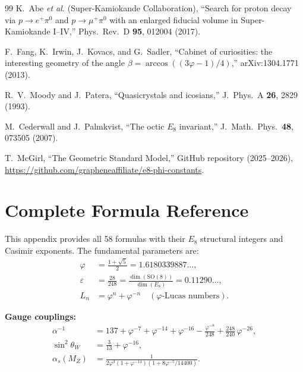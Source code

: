 \documentclass[aps,prd,twocolumn,superscriptaddress,nofootinbib,showpacs]{revtex4-2}
\begin{document}
\begin{thebibliography}{99}
K.~Abe \textit{et al.} (Super-Kamiokande Collaboration),
``Search for proton decay via $p \to e^+ \pi^0$ and $p \to \mu^+
\pi^0$ with an enlarged fiducial volume in Super-Kamiokande I--IV,''
Phys.\ Rev.\ D \textbf{95}, 012004 (2017).

F.~Fang, K.~Irwin, J.~Kovacs, and G.~Sadler,
``Cabinet of curiosities: the interesting geometry of the angle
$\beta = \arccos((3\varphi - 1)/4)$,''
arXiv:1304.1771 (2013).

R.~V.~Moody and J.~Patera,
``Quasicrystals and icosians,''
J.\ Phys.\ A \textbf{26}, 2829 (1993).

M.~Cederwall and J.~Palmkvist,
``The octic $E_8$ invariant,''
J.\ Math.\ Phys.\ \textbf{48}, 073505 (2007).

T.~McGirl,
``The Geometric Standard Model,''
GitHub repository (2025--2026),
\url{https://github.com/grapheneaffiliate/e8-phi-constants}.

\end{thebibliography}

\appendix

\section{Complete Formula Reference}\label{app:formulas}

This appendix provides all 58 formulas with their $E_8$ structural
integers and Casimir exponents.  The fundamental parameters are:
\begin{align}
\varphi &= \frac{1+\sqrt{5}}{2} = 1.6180339887\ldots, \nonumber \\
\varepsilon &= \frac{28}{248} = \frac{\dim(\mathrm{SO}(8))}{\dim(E_8)} = 0.11290\ldots, \nonumber \\
L_n &= \varphi^n + \varphi^{-n} \quad (\text{$\varphi$-Lucas numbers}). \nonumber
\end{align}

\textbf{Gauge couplings:}
\begin{align}
\alpha^{-1} &= 137 + \varphi^{-7} + \varphi^{-14} + \varphi^{-16}
- \frac{\varphi^{-8}}{248} + \frac{248}{240}\,\varphi^{-26},
\tag{A1}\label{eq:A1} \\
\sin^2\theta_W &= \frac{3}{13} + \varphi^{-16},
\tag{A2}\label{eq:A2} \\
\alpha_s(M_Z) &= \frac{1}{2\varphi^3(1+\varphi^{-14})
(1+8\varphi^{-5}/14400)}.
\tag{A3}\label{eq:A3}
\end{align}
\end{document}
